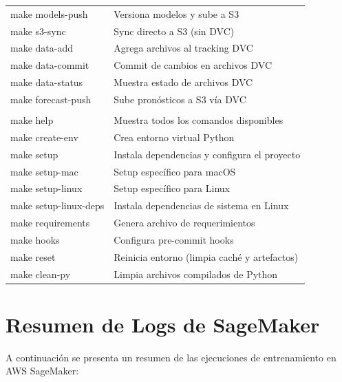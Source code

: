\documentclass[12pt, letterpaper]{article}
\begin{document}
\begin{longtable}{>{\ttfamily\scriptsize}l >{\raggedright\arraybackslash}p{8cm}}
make models-push & Versiona modelos y sube a S3 \\
make s3-sync & Sync directo a S3 (sin DVC) \\
make data-add & Agrega archivos al tracking DVC \\
make data-commit & Commit de cambios en archivos DVC \\
make data-status & Muestra estado de archivos DVC \\
make forecast-push & Sube pronósticos a S3 vía DVC \\
\midrule
\multicolumn{2}{l}{\textit{Setup e infraestructura}} \\
\midrule
make help & Muestra todos los comandos disponibles \\
make create-env & Crea entorno virtual Python \\
make setup & Instala dependencias y configura el proyecto \\
make setup-mac & Setup específico para macOS \\
make setup-linux & Setup específico para Linux \\
make setup-linux-deps & Instala dependencias de sistema en Linux \\
make requirements & Genera archivo de requerimientos \\
make hooks & Configura pre-commit hooks \\
make reset & Reinicia entorno (limpia caché y artefactos) \\
make clean-py & Limpia archivos compilados de Python \\
\end{longtable}

\section{Resumen de Logs de SageMaker}\label{sec:logs_sagemaker}

A continuación se presenta un resumen de las ejecuciones de entrenamiento en AWS SageMaker:
\end{document}
